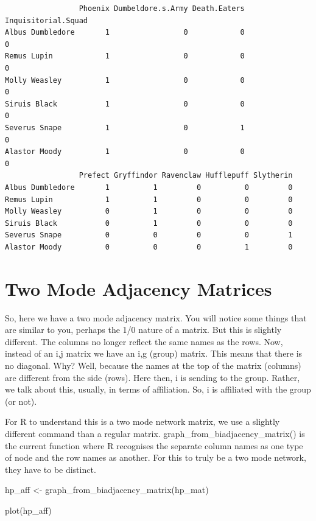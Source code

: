 \documentclass[
  letterpaper,
  DIV=11,
  numbers=noendperiod]{scrreprt}
\newenvironment{Shaded}{\begin{snugshade}}{\end{snugshade}}
\newcommand{\FunctionTok}[1]{\textcolor[rgb]{0.28,0.35,0.67}{#1}}
\newcommand{\NormalTok}[1]{\textcolor[rgb]{0.00,0.23,0.31}{#1}}
\newcommand{\OtherTok}[1]{\textcolor[rgb]{0.00,0.23,0.31}{#1}}
\begin{document}
\begin{verbatim}
                 Phoenix Dumbeldore.s.Army Death.Eaters Inquisitorial.Squad
Albus Dumbledore       1                 0            0                   0
Remus Lupin            1                 0            0                   0
Molly Weasley          1                 0            0                   0
Siruis Black           1                 0            0                   0
Severus Snape          1                 0            1                   0
Alastor Moody          1                 0            0                   0
                 Prefect Gryffindor Ravenclaw Hufflepuff Slytherin
Albus Dumbledore       1          1         0          0         0
Remus Lupin            1          1         0          0         0
Molly Weasley          0          1         0          0         0
Siruis Black           0          1         0          0         0
Severus Snape          0          0         0          0         1
Alastor Moody          0          0         0          1         0
\end{verbatim}

\section{Two Mode Adjacency Matrices}\label{two-mode-adjacency-matrices}

So, here we have a two mode adjacency matrix. You will notice some
things that are similar to you, perhaps the 1/0 nature of a matrix. But
this is slightly different. The columns no longer reflect the same names
as the rows. Now, instead of an i,j matrix we have an i,g (group)
matrix. This means that there is no diagonal. Why? Well, because the
names at the top of the matrix (columns) are different from the side
(rows). Here then, i is sending to the group. Rather, we talk about
this, usually, in terms of affiliation. So, i is affiliated with the
group (or not).

For R to understand this is a two mode network matrix, we use a slightly
different command than a regular matrix.
graph\_from\_biadjacency\_matrix() is the current function where R
recognises the separate column names as one type of node and the row
names as another. For this to truly be a two mode network, they have to
be distinct.

\begin{Shaded}
\begin{Highlighting}[]
\NormalTok{hp\_aff }\OtherTok{\textless{}{-}} \FunctionTok{graph\_from\_biadjacency\_matrix}\NormalTok{(hp\_mat)}


\FunctionTok{plot}\NormalTok{(hp\_aff)}
\end{Highlighting}
\end{Shaded}
\end{document}

